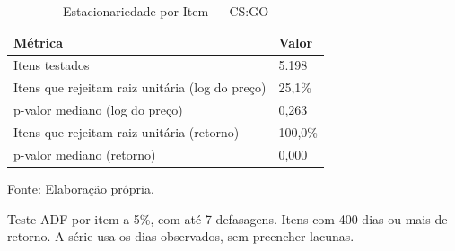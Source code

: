 \begin{table}[H]
\caption{Estacionariedade por Item — CS:GO}\label{tab:stationarity} 

\fontsize{12.0pt}{14.4pt}\selectfont

\begin{tabular*}{\linewidth}{@{\extracolsep{\fill}}ll}
\toprule
\textbf{Métrica} & \textbf{Valor} \\
\midrule\addlinespace[2.5pt]
Itens testados & 5.198 \\
Itens que rejeitam raiz unitária (log do preço) & 25,1\% \\
p-valor mediano (log do preço) & 0,263 \\
Itens que rejeitam raiz unitária (retorno) & 100,0\% \\
p-valor mediano (retorno) & 0,000 \\
\bottomrule
\end{tabular*}
\par\vspace{\belowcaptionskip}\footnotesize Fonte: Elaboração própria.\par
\begin{minipage}{\linewidth}
Teste ADF por item a 5\%, com até 7 defasagens. Itens com 400 dias ou mais de retorno. A série usa os dias observados, sem preencher lacunas.\\
\end{minipage}
\end{table}
